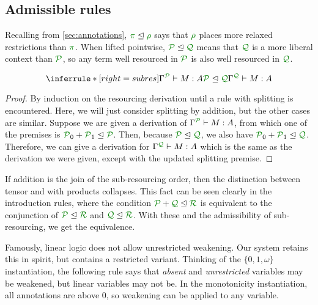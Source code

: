 \subsection{Admissible rules}
\label{sec:admissible}


Recalling from \autoref{sec:annotations}, $\rescomment \pi \subres \rescomment
\rho$ says that $\rescomment \rho$ places more relaxed restrictions than
$\rescomment \pi$.
When lifted pointwise, $\resctx P \subres \resctx Q$ means that
$\resctx Q$ is a more liberal context than $\resctx
 P$, so any term well resourced in $\resctx P$ is also well
resourced in $\resctx Q$.

\begin{lemma}
  \[
    \inferrule*[right=subres]{
      \ctx{\Gamma}{P} \vdash M : A
      \\ \resctx P \subres \resctx Q
    }
    {
      \ctx{\Gamma}{Q} \vdash M : A
    }
  \]
\end{lemma}
\begin{proof}
  By induction on the resourcing derivation until a rule with splitting is
  encountered.
  Here, we will just consider splitting by addition, but the other cases are
  similar.
  Suppose we are given a derivation of $\ctx{\Gamma}{P} \vdash M : A$,
  from which one of the premises is
  $\resctx P_0 + \resctx P_1 \subres \resctx P$.
  Then, because $\resctx P \subres \resctx Q$, we also have
  $\resctx P_0 + \resctx P_1 \subres \resctx Q$.
  Therefore, we can give a derivation for
  $\ctx{\Gamma}{Q} \vdash M : A$ which is the same as the derivation we
  were given, except with the updated splitting premise.
\end{proof}

If addition is the join of the sub-resourcing order, then the distinction
between tensor and with products collapses.
This fact can be seen clearly in the introduction rules, where the condition
$\resctx P + \resctx Q \subres \resctx R$ is equivalent to the conjunction of
$\resctx P \subres \resctx R$ and $\resctx Q \subres \resctx R$.
With these and the admissibility of sub-resourcing, we get the equivalence.

Famously, linear logic does not allow unrestricted weakening.
Our system retains this in spirit, but contains a restricted variant.
Thinking of the $\{0,1,\omega\}$ instantiation, the following rule says that
\emph{absent} and \emph{unrestricted} variables may be weakened, but linear
variables may not be.
In the monotonicity instantiation, all annotations are above $0$, so weakening
can be applied to any variable.

